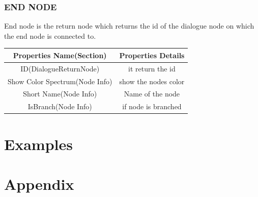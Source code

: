 \documentclass[12pt]{article}
\begin{document}
	  \subsubsection{END NODE}
	  End node is the return node which returns the id of the dialogue node on which the end node is connected to.
		\begin{center}
			\begin{tabular}{|c|c|}\hline
				Properties Name(Section) & Properties Details\\\hline
				ID(DialogueReturnNode) & it return the id \\\hline
				 	Show Color Spectrum(Node Info) & show the nodes 					color\\\hline
			Short Name(Node Info) & Name of the node\\\hline
			IsBranch(Node Info) & if node is branched\\\hline
			\end{tabular}
		\end{center}			  
	  \section{Examples}
	  \section{Appendix}
\end{document}

